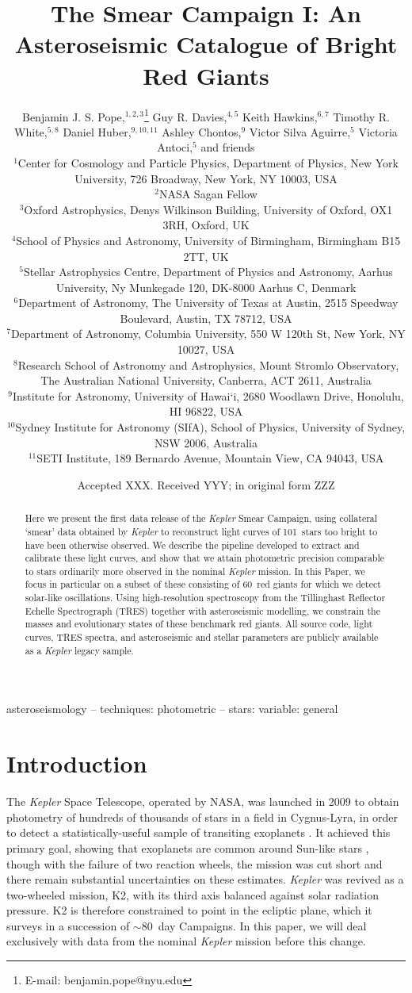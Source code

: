 \documentclass[a4paper,fleqn,usenatbib]{mnras}
\title[The Kepler Smear Campaign]{The \kepler Smear Campaign I: An Asteroseismic Catalogue of Bright Red Giants}
\author[B. J. S. Pope et al.]{Benjamin J. S. Pope,$^{1,2,3}$\thanks{E-mail: benjamin.pope@nyu.edu}
Guy R. Davies,$^{4,5}$
Keith Hawkins,$^{6,7}$
Timothy R. White,$^{5,8}$\newauthor
Daniel Huber,$^{9,10,11}$
Ashley Chontos,$^{9}$
Victor Silva Aguirre,$^{5}$
Victoria Antoci,$^{5}$ and friends
\\
$^{1}$Center for Cosmology and Particle Physics, Department of Physics, New York University, 726 Broadway, New York, NY 10003, USA\\
$^{2}$NASA Sagan Fellow\\
$^{3}$Oxford Astrophysics, Denys Wilkinson Building, University of Oxford, OX1 3RH, Oxford, UK\\
$^{4}$School of Physics and Astronomy, University of Birmingham, Birmingham B15 2TT, UK\\
$^{5}$Stellar Astrophysics Centre, Department of Physics and Astronomy, Aarhus University, Ny Munkegade 120, DK-8000 Aarhus C, Denmark\\
$^{6}$Department of Astronomy, The University of Texas at Austin, 2515 Speedway Boulevard, Austin, TX 78712, USA\\
$^{7}$Department of Astronomy, Columbia University, 550 W 120th St, New York, NY 10027, USA\\
$^{8}$Research School of Astronomy and Astrophysics, Mount Stromlo Observatory, The Australian National University, Canberra, ACT 2611, Australia\\
$^{9}$Institute for Astronomy, University of Hawai‘i, 2680 Woodlawn Drive, Honolulu, HI 96822, USA\\
$^{10}$Sydney Institute for Astronomy (SIfA), School of Physics, University of Sydney, NSW 2006, Australia\\
$^{11}$SETI Institute, 189 Bernardo Avenue, Mountain View, CA 94043, USA
}
\date{Accepted XXX. Received YYY; in original form ZZZ}
\newcommand{\kepler}{\emph{Kepler}\xspace}
\begin{document}
\label{firstpage}
\pagerange{\pageref{firstpage}--\pageref{lastpage}}
\maketitle

\begin{abstract}
Here we present the first data release of the \kepler Smear Campaign, using collateral `smear' data obtained by \kepler to reconstruct light curves of 101~stars too bright to have been otherwise observed. We describe the pipeline developed to extract and calibrate these light curves, and show that we attain photometric precision comparable to stars ordinarily more observed in the nominal \kepler mission. In this Paper, we focus in particular on a subset of these consisting of 60~red giants for which we detect solar-like oscillations. Using high-resolution spectroscopy from the Tillinghast Reflector Echelle Spectrograph (TRES) together with asteroseismic modelling, we constrain the masses and evolutionary states of these benchmark red giants. All source code, light curves, TRES spectra, and asteroseismic and stellar parameters are publicly available as a \kepler legacy sample.
\end{abstract}

\begin{keywords}
asteroseismology -- techniques: photometric -- stars: variable: general
\end{keywords}



\section{Introduction}
\label{intro}

The \kepler Space Telescope, operated by NASA, was launched in 2009 to obtain photometry of hundreds of thousands of stars in a field in Cygnus-Lyra, in order to detect a statistically-useful sample of transiting exoplanets \citep{2010Sci...327..977B}. It achieved this primary goal, showing that exoplanets are common around Sun-like stars \citep{2013ApJ...766...81F,2013PNAS..11019273P,2014ApJ...795...64F}, though with the failure of two reaction wheels, the mission was cut short and there remain substantial uncertainties on these estimates. \kepler was revived as a two-wheeled mission, K2, with its third axis balanced against solar radiation pressure. K2 is therefore constrained to point in the ecliptic plane, which it surveys in a succession of $\sim 80$~day Campaigns. In this paper, we will deal exclusively with data from the nominal \kepler mission before this change.
\end{document}
